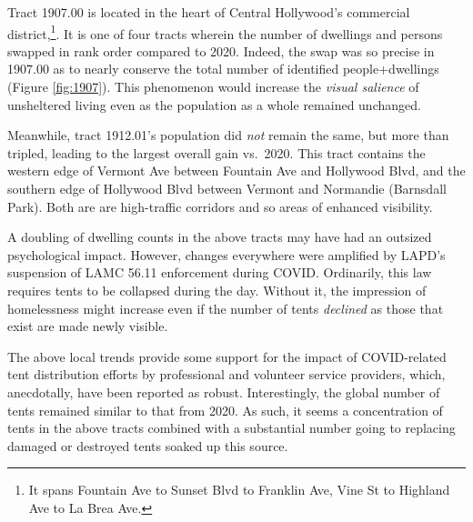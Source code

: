 \documentclass[11pt,twocolumn]{article}
\begin{document}
Tract 1907.00 is located in the heart of Central Hollywood's commercial district,\footnote{It spans Fountain Ave to 
Sunset Blvd to Franklin Ave, Vine St to Highland Ave to La Brea Ave.}.  It is one of four tracts wherein the number
of dwellings and persons swapped in rank order compared to 2020. Indeed, the swap was so precise in 1907.00
as to nearly conserve the total number of identified people+dwellings (Figure \ref{fig:1907}). This phenomenon would 
increase the {\it visual salience} of unsheltered living even as the population as a whole remained unchanged.

Meanwhile, tract 1912.01's population did {\it not} remain the same, but more than tripled, leading to the largest 
overall gain vs.~2020. This tract contains the western edge of Vermont Ave between Fountain Ave and Hollywood
Blvd, and the southern edge of Hollywood Blvd between Vermont and Normandie (Barnsdall Park). Both are
are high-traffic corridors and so areas of enhanced visibility. 

A doubling of dwelling counts in the above tracts may have had an outsized psychological impact. However, changes
everywhere were amplified by LAPD's suspension of LAMC 56.11 enforcement during COVID. Ordinarily, this law
requires tents to be collapsed during the day. Without it, the impression of homelessness might increase even 
if the number of tents {\it declined} as those that exist are made newly visible.

The above local trends provide some support for the impact of COVID-related tent distribution efforts by professional
and volunteer service providers, which, anecdotally, have been reported as robust. Interestingly, the global 
number of tents remained similar to that from 2020. As such, it seems a concentration of tents in the above
tracts combined with a substantial number going to replacing damaged or destroyed tents soaked up this
source.


\end{document}
